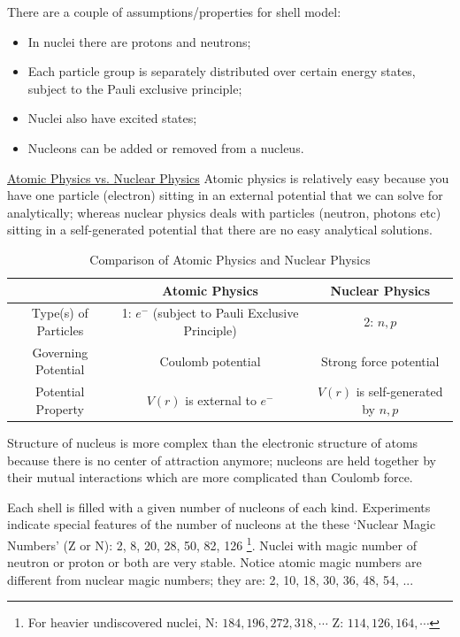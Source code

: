 \documentclass{school-22.101-notes}
\begin{document}
There are a couple of assumptions/properties for shell model: 
\begin{itemize}
\item In nuclei there are protons and neutrons;
\item Each particle group is separately distributed over certain energy states, subject to the Pauli exclusive principle;
\item Nuclei also have excited states;
\item Nucleons can be added or removed from a nucleus. 
\end{itemize}

\uline{Atomic Physics vs. Nuclear Physics}
Atomic physics is relatively easy because you have one particle (electron) sitting in an external potential that we can solve for analytically; whereas nuclear physics deals with particles (neutron, photons etc) sitting in a self-generated potential that there are no easy analytical solutions. 
\begin{table}[h!]
    \centering
    \begin{tabular}{|c|c|c|} \hline
    & Atomic Physics & Nuclear Physics \\ \hline
    Type(s) of Particles &   1: $e^-$ (subject to Pauli Exclusive Principle) & 2: $n, p$ \\ \hline
    Governing Potential & Coulomb potential & Strong force potential \\ \hline
    Potential Property & $V(r)$ is external to $e^-$ & $V(r)$ is self-generated by $n,p$ \\ \hline
    \end{tabular}
    \caption{Comparison of Atomic Physics and Nuclear Physics}
\end{table}

Structure of nucleus is more complex than the electronic structure of atoms because there is no center of attraction anymore; nucleons are held together by their mutual interactions which are more complicated than Coulomb force. 

Each shell is filled with a given number of nucleons of each kind. Experiments indicate special features of the number of nucleons at the these `Nuclear Magic Numbers' (Z or N): 2, 8, 20, 28, 50, 82, 126 \footnote{For heavier undiscovered nuclei, N: $184, 196, 272, 318, \cdots$ Z: $114, 126, 164, \cdots$}. Nuclei with magic number of neutron or proton or both are very stable. Notice atomic magic numbers are different from nuclear magic numbers; they are: 2, 10, 18, 30, 36, 48, 54, ...
\end{document}
